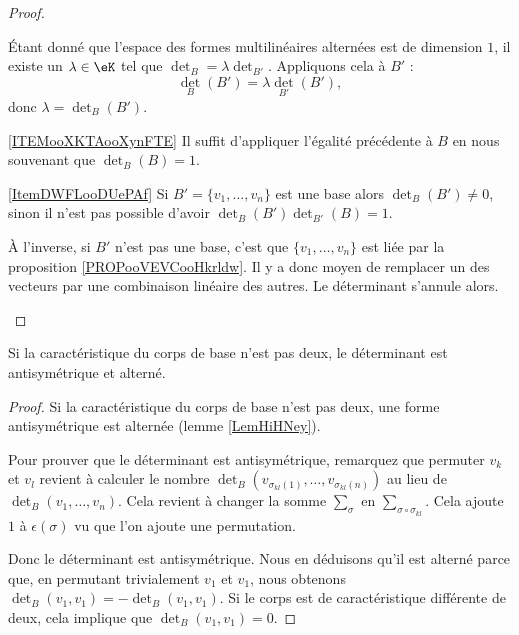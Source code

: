 \begin{proof}
\begin{subproof}
            Étant donné que l'espace des formes multilinéaires alternées est de dimension \( 1\), il existe un \( \lambda\in \eK\) tel que \( \det_B=\lambda\det_{B'}\). Appliquons cela à \( B'\) :
            \begin{equation}
                \det_B(B')=\lambda\det_{B'}(B'),
            \end{equation}
            donc \( \lambda=\det_B(B')\).
        \item[\ref{ITEMooXKTAooXynFTE}]
            Il suffit d'appliquer l'égalité précédente à \( B\) en nous souvenant que \( \det_B(B)=1\).
        \item[\ref{ItemDWFLooDUePAf}]
            Si \( B'=\{ v_1,\ldots, v_n \}\) est une base alors \( \det_B(B')\neq 0\), sinon il n'est pas possible d'avoir \( \det_B(B')\det_{B'}(B)=1\).

            À l'inverse, si \( B'\) n'est pas une base, c'est que \( \{ v_1,\ldots, v_n \}\) est liée par la proposition \ref{PROPooVEVCooHkrldw}. Il y a donc moyen de remplacer un des vecteurs par une combinaison linéaire des autres. Le déterminant s'annule alors.
    \end{subproof}
\end{proof}

\begin{proposition}     \label{PROPooXNLDooGGkHpd}
    Si la caractéristique du corps de base n'est pas deux, le déterminant est antisymétrique et alterné.
\end{proposition}

\begin{proof}
    Si la caractéristique du corps de base n'est pas deux, une forme antisymétrique est alternée (lemme \ref{LemHiHNey}).

    Pour prouver que le déterminant est antisymétrique, remarquez que permuter \( v_k\) et \( v_l\) revient à calculer le nombre \( \det_B( v_{\sigma_{kl}(1)},\ldots, v_{\sigma_{kl}(n)} )\) au lieu de \( \det_B(v_1,\ldots, v_n)\). Cela revient à changer la somme \( \sum_{\sigma}\) en \( \sum_{\sigma\circ\sigma_{kl}}\). Cela ajoute \( 1\) à \( \epsilon(\sigma)\) vu que l'on ajoute une permutation.

    Donc le déterminant est antisymétrique. Nous en déduisons qu'il est alterné parce que, en permutant trivialement \( v_1\) et \( v_1\), nous obtenons \( \det_B(v_1,v_1)=-\det_B(v_1,v_1)\). Si le corps est de caractéristique différente de deux, cela implique que \( \det_B(v_1,v_1)=0\).
\end{proof}

